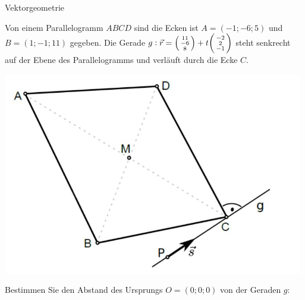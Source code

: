 \columnbreak

\begin{example2}[breakable]{Vektorgeometrie}

    Von einem Parallelogramm $A B C D$ sind die Ecken ist $A=(-1 ;-6 ; 5)$ und $B=(1 ;-1 ; 11)$ gegeben. Die Gerade $g: \vec{r}=\begin{psmallmatrix}11 \\ -6 \\ 8\end{psmallmatrix}+t\begin{psmallmatrix}-2 \\ 2 \\ -1\end{psmallmatrix}$ steht senkrecht auf der Ebene des Parallelogramms und verläuft durch die Ecke $C$.

    \begin{center}
        \includegraphics[width=0.6\linewidth]{images/bsp_vektorgeometrie.png}
    \end{center}

    Bestimmen Sie den Abstand des Ursprungs $O=(0 ; 0 ; 0)$ von der Geraden $g$:



\end{example2}
